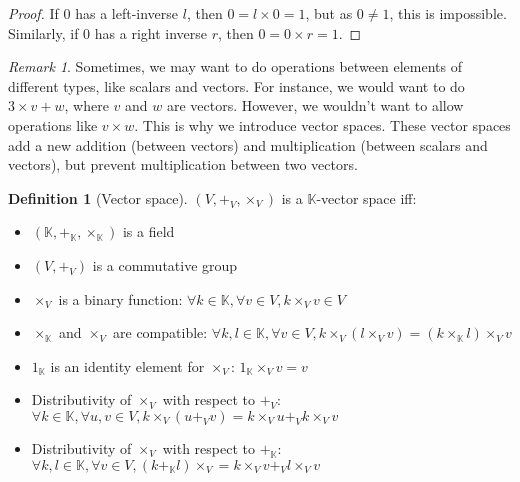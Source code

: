 \documentclass{article}
\theoremstyle{definition}
\newtheorem{definition}{Definition}[section]
\theoremstyle{remark}
\newtheorem*{remark}{Remark}
\theoremstyle{example}
\begin{document}
\begin{proof}
		If 0 has a left-inverse $l$, then $0 = l \times 0 = 1$, but as $0 \neq 1$, this is impossible. Similarly, if 0 has a right inverse $r$, then $0 = 0 \times r = 1$.
\end{proof}

\begin{remark}
		Sometimes, we may want to do operations between elements of different types, like scalars and vectors. For instance, we would want to do $3 \times v + w$, where $v$ and $w$ are vectors. However, we wouldn't want to allow operations like $v \times w$. This is why we introduce vector spaces. These vector spaces add a new addition (between vectors) and multiplication (between scalars and vectors), but prevent multiplication between two vectors.
\end{remark}

\begin{definition}[Vector space]
		$(V, +_V, \times_V)$ is a $\mathbb{K}$-vector space iff:
		\begin{itemize}
				\item $(\mathbb{K}, +_\mathbb{K}, \times_\mathbb{K})$ is a field
				\item $(V, +_V)$ is a commutative group
				\item $\times_V$ is a binary function: $\forall k \in \mathbb{K}, \forall v \in V, k \times_V v \in V$
				\item $\times_\mathbb{K}$ and $\times_V$ are compatible: $\forall k, l \in \mathbb{K}, \forall v \in V, k \times_V (l \times_V v) = (k \times_\mathbb{K} l) \times_V v$
				\item $1_\mathbb{K}$ is an identity element for $\times_V$: $1_\mathbb{K} \times_V v = v$
				\item Distributivity of $\times_V$ with respect to $+_V$: $\forall k \in \mathbb{K}, \forall u, v \in V, k \times_V (u +_V v) = k \times_V u +_V k \times_V v$
				\item Distributivity of $\times_V$ with respect to $+_\mathbb{K}$: $\forall k, l \in \mathbb{K}, \forall v \in V, (k +_\mathbb{K} l) \times_V = k \times_V v +_V l \times_V v$
		\end{itemize}
\end{definition}
\end{document}
